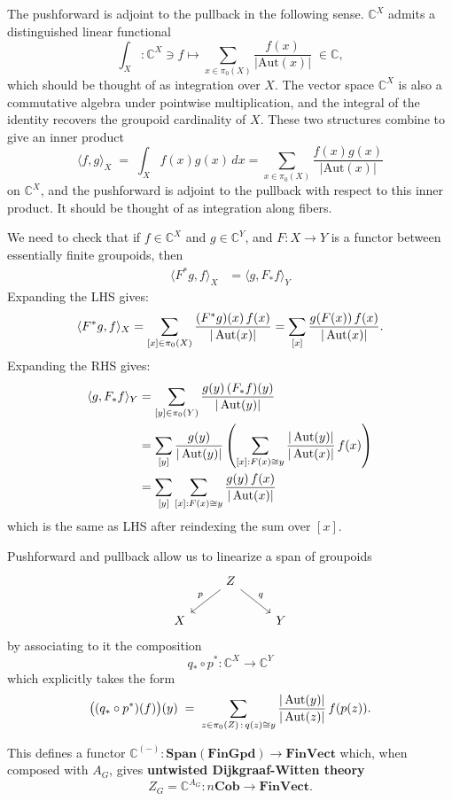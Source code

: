 \documentclass[12pt]{article}
\begin{document}
The pushforward is adjoint to the pullback in the following sense. $\mathbb{C}^X$ admits a distinguished linear functional
\[
    \int_X : \mathbb{C}^X \ni f \longmapsto \sum_{x \in \pi_0(X)} \frac{f(x)}{|\mathrm{Aut}(x)|} \;\in \mathbb{C},
\]
which should be thought of as integration over $X$. The vector space $\mathbb{C}^X$ is also a commutative algebra under pointwise multiplication, and the integral of the identity recovers the groupoid cardinality of $X$. These two structures combine to give an inner product
\[
    \langle f,g \rangle_X \;=\; \int_X f(x)g(x)\, dx
    = \sum_{x \in \pi_0(X)} \frac{f(x)g(x)}{|\mathrm{Aut}(x)|}
\]
on $\mathbb{C}^X$, and the pushforward is adjoint to the pullback with respect to this inner product. It should be thought of as integration along fibers.

\begin{remark}
    We need to check that if $f\in \mathbb{C}^X$ and $g\in \mathbb{C}^Y$, and $F : X \to Y$ is a functor between essentially finite groupoids, then
     \begin{align*}
        \langle F^* g, f\rangle_X & = \langle g, F_* f\rangle_Y
    \end{align*}
Expanding the LHS gives:
\[
\langle F^* g, f\rangle_X
= \sum_{[x]\in \pi_0(X)} \frac{(F^* g)(x)\, f(x)}{|\operatorname{Aut}(x)|}
= \sum_{[x]} \frac{g(F(x))\, f(x)}{|\operatorname{Aut}(x)|}.
\]
Expanding the RHS gives:
\begin{align*}
    \langle g, F_* f\rangle_Y &= \sum_{[y]\in \pi_0(Y)} \frac{g(y)\, (F_* f)(y)}{|\operatorname{Aut}(y)|} \\
    &= \sum_{[y]} \frac{g(y)}{|\operatorname{Aut}(y)|} \left( \sum_{[x]:F(x)\cong y} \frac{|\operatorname{Aut}(y)|}{|\operatorname{Aut}(x)|}\, f(x) \right) \\
    &= \sum_{[y]} \sum_{[x]:F(x)\cong y} \frac{g(y)\, f(x)}{|\operatorname{Aut}(x)|}
\end{align*}
which is the same as LHS after reindexing the sum over $[x]$. 
\end{remark}
Pushforward and pullback allow us to linearize a span of groupoids
\[
\begin{tikzcd}
& Z \arrow[dl, "p"'] \arrow[dr, "q"] & \\
X & & Y
\end{tikzcd}
\]
by associating to it the composition
\[
q_* \circ p^* : \mathbb{C}^X \to \mathbb{C}^Y
\]
which explicitly takes the form
\[
\big((q_* \circ p^*)(f)\big)(y) \;=\; 
\sum_{z \in \pi_0(Z)\,:\,q(z)\cong y} \frac{|\operatorname{Aut}(y)|}{|\operatorname{Aut}(z)|}\, f(p(z)).
\]

This defines a functor $\mathbb{C}^{(-)} : \mathbf{Span}(\mathbf{FinGpd}) \to \mathbf{FinVect}$ which, when composed with $A_G$, gives \textbf{untwisted Dijkgraaf-Witten theory}
\[
Z_G = \mathbb{C}^{A_G} : n\mathbf{Cob} \to \mathbf{FinVect}.
\]
\end{document}
